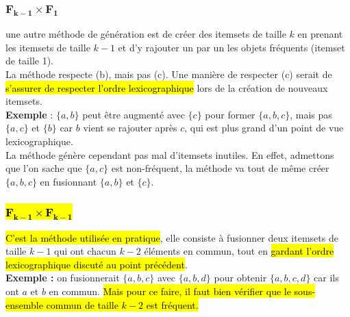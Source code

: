 \documentclass[letterpaper, 12pt]{article}
\newcommand{\alinea}{
\hspace*{0.5cm}}
\begin{document}
			\subsubsection{$\mathbf{F_{k-1} \times F_1}$}
				\alinea une autre méthode de génération est de 
					créer des itemsets de taille $k$ en prenant 
					les itemsets de taille $k-1$ et d'y rajouter 
					un par un les objets fréquents (itemset de taille 1).\\
				\alinea La méthode respecte (b), mais pas (c). Une manière de 
					respecter (c) serait de \hl{s'assurer de respecter l'ordre
					lexicographique} lors de la création de nouveaux 
					itemsets. \\
				\textbf{Exemple} : $\{a, b\}$ peut être 
					augmenté
					avec $\{c\}$ pour former  $\{a,b,c\}$, mais pas 
					$\{a, c\}$ et $\{b\}$ car $b$ vient se rajouter
					après $c$, qui est plus grand d'un point de vue
					lexicographique.\\
				\alinea La méthode génère cependant pas mal d'itemsets
					inutiles. En effet, admettons que l'on sache que 
					$\{a,c\}$ est non-fréquent, la méthode va tout
					de même créer $\{a,b,c\}$ en fusionnant $\{a,b\}$
					et $\{c\}$.
			\newpage
			\subsubsection{\hl{$\mathbf{F_{k-1} \times F_{k-1}}$}}
				\alinea \hl{C'est la méthode utilisée en pratique}, 
					elle consiste à fusionner deux itemsets de taille
					$k-1$ qui ont chacun $k-2$ éléments en commun, tout
					en \hl{gardant l'ordre lexicographique discuté au point
					précédent}.\\
				\textbf{Exemple :} on fusionnerait $\{a,b,c\}$ avec
					$\{a,b,d\}$ pour obtenir $\{a,b,c,d\}$ car ils ont $a$ et
					$b$ en commun. \hl{Mais pour ce faire, il faut bien
					vérifier que le sous-ensemble commun de taille $k-2$ 
					est fréquent.}
\end{document}
